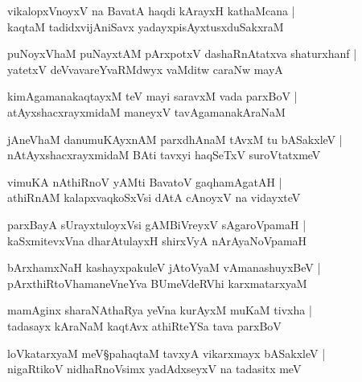 \begin{shloka}
vikalopxVnoyxV na BavatA haqdi kArayxH kathaMcana |\\
kaqtaM tadidxvijAniSavx yadayxpisAyxtusxduSakxraM
\end{shloka}

\begin{shloka}
puNoyxVhaM puNayxtAM pArxpotxV dashaRnAtatxva shaturxhanf |\\
yatetxV deVvavareYvaRMdwyx vaMditw caraNw mayA
\end{shloka}

\begin{shloka}
kimAgamanakaqtayxM teV mayi saravxM vada parxBoV |\\
atAyxshacxrayxmidaM maneyxV tavAgamanakAraNaM
\end{shloka}

\begin{shloka}
jAneVhaM danumuKAyxnAM parxdhAnaM tAvxM tu bASakxleV |\\
nAtAyxshacxrayxmidaM BAti tavxyi haqSeTxV suroVtatxmeV 
\end{shloka}

\begin{shloka}
vimuKA nAthiRnoV yAMti BavatoV gaqhamAgatAH |\\
athiRnAM kalapxvaqkoSxVsi dAtA cAnoyxV na vidayxteV 
\end{shloka}

\begin{shloka}
parxBayA sUrayxtuloyxVsi gAMBiVreyxV sAgaroVpamaH |\\
kaSxmitevxVna dharAtulayxH shirxVyA nArAyaNoVpamaH 
\end{shloka}

\begin{shloka}
bArxhamxNaH kashayxpakuleV jAtoVyaM vAmanashuyxBeV |\\
pArxthiRtoVhamaneVneYva BUmeVdeRVhi karxmatarxyaM 
\end{shloka}

\begin{shloka}
mamAginx sharaNAthaRya yeVna kurAyxM muKaM tivxha |\\
tadasayx kAraNaM kaqtAvx athiRteYSa tava parxBoV 
\end{shloka}

\begin{shloka}
loVkatarxyaM meV\S pahaqtaM tavxyA vikarxmayx bASakxleV |\\
nigaRtikoV nidhaRnoVsimx yadAdxseyxV na tadasitx meV 
\end{shloka}

